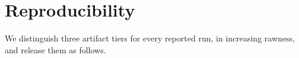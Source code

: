 \documentclass{article}
\begin{document}




\appendix


\begingroup
\newcommand{\artifactstatusword}{anonymous}

\endgroup



\section{Reproducibility}
\label{sec:appendix:reproducibility}

We distinguish three artifact tiers for every reported run, in increasing
rawness, and release them as follows.
\end{document}
